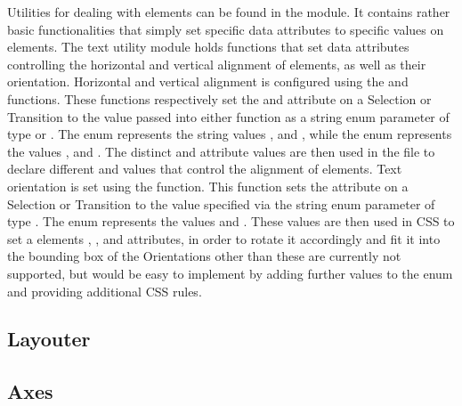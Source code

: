 Utilities for dealing with  elements can be found in the  module.
It contains rather basic functionalities that simply set specific data attributes to specific values on  elements.
The text utility module holds functions that set data attributes controlling the horizontal and vertical alignment of  elements, as well as their orientation.
Horizontal and vertical alignment is configured using the  and  functions.
These functions respectively set the  and  attribute on a Selection or Transition to the value passed into either function as a string enum parameter of type  or .   
The  enum represents the string values ,  and , while the  enum represents the values ,  and . 
The distinct  and  attribute values are then used in the  file to declare different  and  values that control the alignment of  elements. 
Text orientation is set using the  function.
This function sets the  attribute on a Selection or Transition to the value specified via the string enum parameter of type .
The  enum represents the values  and .
These  values are then used in CSS to set a  elements , , and  attributes, in order to rotate it accordingly and fit it into the bounding box of the 
Orientations other than these are currently not supported, but would be easy to implement by adding further values to the  enum and providing additional CSS rules.




\subsection{Layouter}


\subsection{Axes}

